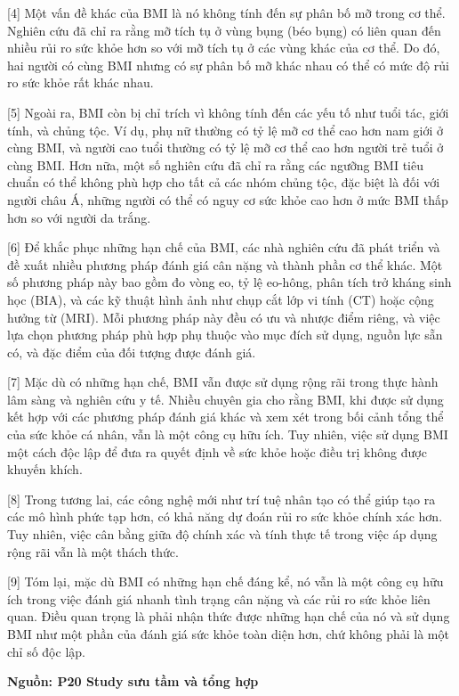 \documentclass[12pt,a4paper,twoside]{article}
\newenvironment{readingpassage}[1][]{%
    \begin{tcolorbox}[enhanced, colback=grayLight, colframe=secondaryBlue,
        coltitle=textDark, fonttitle=\bfseries, title={#1},
        rounded corners, arc=3mm, boxrule=1pt,
        left=15pt, right=15pt, top=10pt, bottom=10pt,
        breakable, before skip=10pt, after skip=10pt, drop fuzzy shadow]
    \setstretch{1.3}
}{\end{tcolorbox}}
\begin{document}
\begin{readingpassage}[]
[4] Một vấn đề khác của BMI là nó không tính đến sự phân bố mỡ trong cơ thể. Nghiên cứu đã chỉ ra rằng mỡ tích tụ ở vùng bụng (béo bụng) có liên quan đến nhiều rủi ro sức khỏe hơn so với mỡ tích tụ ở các vùng khác của cơ thể. Do đó, hai người có cùng BMI nhưng có sự phân bố mỡ khác nhau có thể có mức độ rủi ro sức khỏe rất khác nhau.

[5] Ngoài ra, BMI còn bị chỉ trích vì không tính đến các yếu tố như tuổi tác, giới tính, và chủng tộc. Ví dụ, phụ nữ thường có tỷ lệ mỡ cơ thể cao hơn nam giới ở cùng BMI, và người cao tuổi thường có tỷ lệ mỡ cơ thể cao hơn người trẻ tuổi ở cùng BMI. Hơn nữa, một số nghiên cứu đã chỉ ra rằng các ngưỡng BMI tiêu chuẩn có thể không phù hợp cho tất cả các nhóm chủng tộc, đặc biệt là đối với người châu Á, những người có thể có nguy cơ sức khỏe cao hơn ở mức BMI thấp hơn so với người da trắng.

[6] Để khắc phục những hạn chế của BMI, các nhà nghiên cứu đã phát triển và đề xuất nhiều phương pháp đánh giá cân nặng và thành phần cơ thể khác. Một số phương pháp này bao gồm đo vòng eo, tỷ lệ eo-hông, phân tích trở kháng sinh học (BIA), và các kỹ thuật hình ảnh như chụp cắt lớp vi tính (CT) hoặc cộng hưởng từ (MRI). Mỗi phương pháp này đều có ưu và nhược điểm riêng, và việc lựa chọn phương pháp phù hợp phụ thuộc vào mục đích sử dụng, nguồn lực sẵn có, và đặc điểm của đối tượng được đánh giá.

[7] Mặc dù có những hạn chế, BMI vẫn được sử dụng rộng rãi trong thực hành lâm sàng và nghiên cứu y tế. Nhiều chuyên gia cho rằng BMI, khi được sử dụng kết hợp với các phương pháp đánh giá khác và xem xét trong bối cảnh tổng thể của sức khỏe cá nhân, vẫn là một công cụ hữu ích. Tuy nhiên, việc sử dụng BMI một cách độc lập để đưa ra quyết định về sức khỏe hoặc điều trị không được khuyến khích.

[8] Trong tương lai, các công nghệ mới như trí tuệ nhân tạo có thể giúp tạo ra các mô hình phức tạp hơn, có khả năng dự đoán rủi ro sức khỏe chính xác hơn. Tuy nhiên, việc cân bằng giữa độ chính xác và tính thực tế trong việc áp dụng rộng rãi vẫn là một thách thức.

[9] Tóm lại, mặc dù BMI có những hạn chế đáng kể, nó vẫn là một công cụ hữu ích trong việc đánh giá nhanh tình trạng cân nặng và các rủi ro sức khỏe liên quan. Điều quan trọng là phải nhận thức được những hạn chế của nó và sử dụng BMI như một phần của đánh giá sức khỏe toàn diện hơn, chứ không phải là một chỉ số độc lập.

\hfill \textbf{Nguồn: P20 Study sưu tầm và tổng hợp}
\end{readingpassage}
\end{document}
